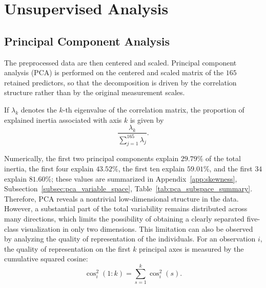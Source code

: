 \section{Unsupervised Analysis}
\subsection{Principal Component Analysis}
The preprocessed data are then centered and scaled. Principal component analysis (PCA) is performed on the centered and scaled matrix of the \(165\) retained predictors, so that the decomposition is driven by the correlation structure rather than by the original measurement scales.

If \(\lambda_k\) denotes the \(k\)-th eigenvalue of the correlation matrix, the proportion of explained inertia associated with axis \(k\) is given by
\begin{equation}
\frac{\lambda_k}{\sum_{j=1}^{165}\lambda_j}.
\label{eq:pca_inertia_ratio}
\end{equation}

Numerically, the first two principal components explain \(29.79\%\) of the total inertia, the first four explain \(43.52\%\), the first ten explain \(59.01\%\), and the first \(34\) explain \(81.60\%\); these values are summarized in Appendix~\ref{app:skewness}, Subsection~\ref{subsec:pca_variable_space}, Table~\ref{tab:pca_subspace_summary}. Therefore, PCA reveals a nontrivial low-dimensional structure in the data. However, a substantial part of the total variability remains distributed across many directions, which limits the possibility of obtaining a clearly separated five-class visualization in only two dimensions. This limitation can also be observed by analyzing the quality of representation of the individuals. For an observation \(i\), the quality of representation on the first \(k\) principal axes is measured by the cumulative squared cosine:
\begin{equation}
\cos^2_i(1{:}k)=\sum_{s=1}^k \cos^2_i(s).
\label{eq:pca_cumulative_cos2}
\end{equation}

